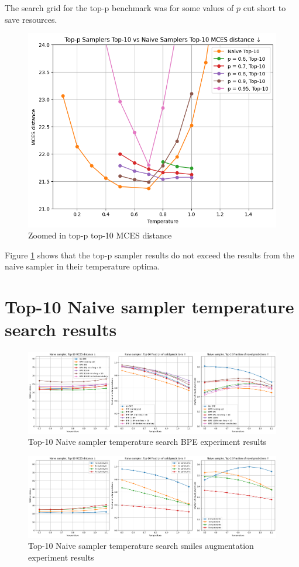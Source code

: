 The search grid for the top-p benchmark was for some values of $p$ cut short to save resources.

\begin{figure}[h]
    \centering
    \includegraphics[width=0.6\linewidth]{figures/appendix/samplers/top-p_vs_naive_top-10.png}
    \caption{Zoomed in top-p top-10 MCES distance}
    \label{fig:top-p_zoomed_appendix}
\end{figure}

Figure \ref{fig:top-p_zoomed_appendix} shows that the top-p sampler results do not exceed the results from the naive sampler in their temperature optima.


\section{Top-10 Naive sampler temperature search results}
\label{sec:temp_search_appendix}

\begin{figure}[h]
    \centering
    \includegraphics[width=1.0\textwidth]{figures/appendix/bpe.png}
    \caption{Top-10 Naive sampler temperature search BPE experiment results}
    \label{fig:bpe_appendix}
\end{figure}

\begin{figure}[h]
    \centering
    \includegraphics[width=1.0\textwidth]{figures/appendix/smiles_augmentation.png}
    \caption{Top-10 Naive sampler temperature search smiles augmentation experiment results}
    \label{fig:smiles_augmentation_appendix}
\end{figure}

